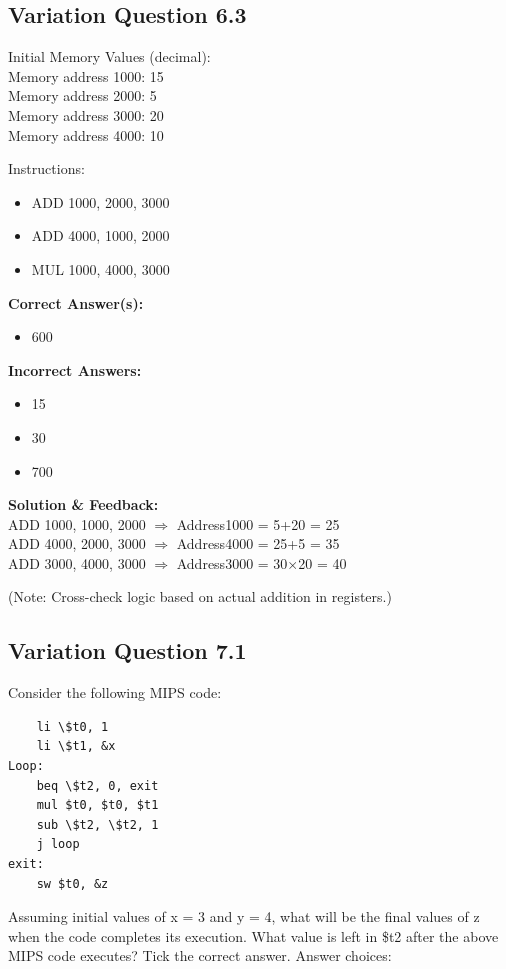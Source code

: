 \subsection{Variation Question 6.3}

Initial Memory Values (decimal):\\
Memory address 1000: 15\\
Memory address 2000: 5\\
Memory address 3000: 20\\
Memory address 4000: 10

Instructions:
\begin{itemize}
    \item ADD 1000, 2000, 3000
    \item ADD 4000, 1000, 2000
    \item MUL 1000, 4000, 3000
\end{itemize}

\textbf{Correct Answer(s):}
\begin{itemize}
    \item 600
\end{itemize}

\textbf{Incorrect Answers:}
\begin{itemize}
    \item 15
    \item 30
    \item 700
\end{itemize}

\textbf{Solution \& Feedback:}\\
ADD 1000, 1000, 2000 $\Rightarrow$ Address1000 = 5+20 = 25\\
ADD 4000, 2000, 3000 $\Rightarrow$ Address4000 = 25+5 = 35\\
ADD 3000, 4000, 3000 $\Rightarrow$ Address3000 = 30$\times$20 = 40

(Note: Cross-check logic based on actual addition in registers.)

\subsection{Variation Question 7.1}
Consider the following MIPS code:

\begin{lstlisting}
    li \$t0, 1
    li \$t1, &x
Loop: 
    beq \$t2, 0, exit
    mul $t0, $t0, $t1
    sub \$t2, \$t2, 1
    j loop
exit:
    sw $t0, &z
\end{lstlisting}
Assuming initial values of x = 3 and y = 4, what will be the
final values of z when the code completes its execution.
What value is left in \$t2 after the above MIPS code executes?
Tick the correct answer.
Answer choices:

